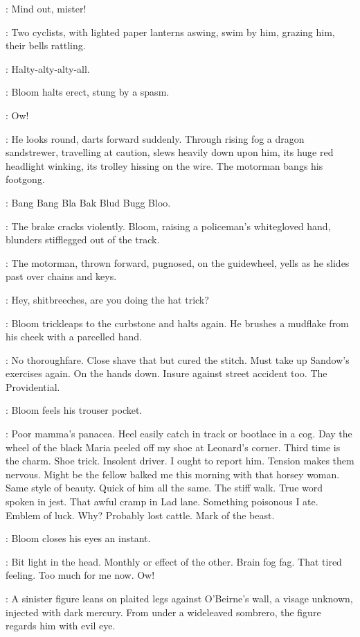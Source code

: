 \Urchins:
Mind out,
mister!

:
Two cyclists,
with lighted paper lanterns aswing,
swim by him,
grazing him,
their bells rattling.

\Bells:
Halty-alty-alty-all.

:
Bloom halts erect,
stung by a spasm.

\Bloom:
Ow!

:
He looks round,
darts forward suddenly.
Through rising fog a dragon sandstrewer,
travelling at caution,
slews heavily down upon him,
its huge red headlight winking,
its trolley hissing on the wire.
The motorman bangs his footgong.

\Gong:
Bang Bang Bla Bak Blud Bugg Bloo.

:
The brake cracks violently.
Bloom,
raising a policeman's whitegloved hand,
blunders stifflegged out of the track.

:
The motorman,
thrown forward,
pugnosed,
on the guidewheel,
yells as he slides past over chains and keys.

\Motorman:
Hey,
shitbreeches,
are you doing the hat trick?

:
Bloom trickleaps to the curbstone and halts again.
He brushes a mudflake from his cheek with a parcelled hand.

\Bloom:
No thoroughfare.
Close shave that but cured the stitch.
Must take up Sandow's exercises again.
On the hands down.
Insure against street accident too.
The Providential.

:
Bloom feels his trouser pocket.

\Bloom:
Poor mamma's panacea.
Heel easily catch in track or bootlace in a cog.
Day the wheel of the black Maria peeled off my shoe at Leonard's corner.
Third time is the charm.
Shoe trick.
Insolent driver.
I ought to report him.
Tension makes them nervous.
Might be the fellow balked me this morning with that horsey woman.
Same style of beauty.
Quick of him all the same.
The stiff walk.
True word spoken in jest.
That awful cramp in Lad lane.
Something poisonous I ate.
Emblem of luck.
Why? Probably lost cattle.
Mark of the beast.

:
Bloom closes his eyes an instant.

\Bloom:
Bit light in the head.
Monthly or effect of the other.
Brain fog fag.
That tired feeling.
Too much for me now.
Ow!

:
A sinister figure leans on plaited legs against O'Beirne's wall,
a visage unknown,
injected with dark mercury.
From under a wideleaved sombrero,
the figure regards him with evil eye.

